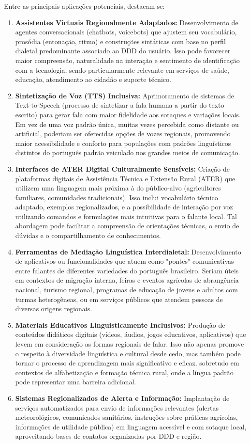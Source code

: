 Entre as principais aplicações potenciais, destacam-se:
\begin{enumerate}
    \item \textbf{Assistentes Virtuais Regionalmente Adaptados:} Desenvolvimento de agentes conversacionais (chatbots, voicebots) que ajustem seu vocabulário, prosódia (entonação, ritmo) e construções sintáticas com base no perfil dialetal predominante associado ao DDD do usuário. Isso pode favorecer maior compreensão, naturalidade na interação e sentimento de identificação com a tecnologia, sendo particularmente relevante em serviços de saúde, educação, atendimento ao cidadão e suporte técnico.
    \item \textbf{Sintetização de Voz (TTS) Inclusiva:} Aprimoramento de sistemas de Text-to-Speech (processo de sintetizar a fala humana a partir do texto escrito) para gerar fala com maior fidelidade aos sotaques e variações locais. Em vez de uma voz padrão única, muitas vezes percebida como distante ou artificial, poderiam ser oferecidas opções de vozes regionais, promovendo maior acessibilidade e conforto para populações com padrões linguísticos distintos do português padrão veiculado nos grandes meios de comunicação.
    \item \textbf{Interfaces de ATER Digital Culturalmente Sensíveis:} Criação de plataformas digitais de Assistência Técnica e Extensão Rural (ATER) que utilizem uma linguagem mais próxima à do público-alvo (agricultores familiares, comunidades tradicionais). Isso inclui vocabulário técnico adaptado, exemplos regionalizados, e a possibilidade de interação por voz utilizando comandos e formulações mais intuitivas para o falante local. Tal abordagem pode facilitar a compreensão de orientações técnicas, o envio de dúvidas e o compartilhamento de conhecimentos.
    \item \textbf{Ferramentas de Mediação Linguística Interdialetal:} Desenvolvimento de aplicativos ou funcionalidades que atuem como "pontes" comunicativas entre falantes de diferentes variedades do português brasileiro. Seriam úteis em contextos de migração interna, feiras e eventos agrícolas de abrangência nacional, turismo regional, programas de educação de jovens e adultos com turmas heterogêneas, ou em serviços públicos que atendem pessoas de diversas origens regionais.
    \item \textbf{Materiais Educativos Linguisticamente Inclusivos:} Produção de conteúdos didáticos digitais (vídeos, áudios, jogos educativos, aplicativos) que levem em consideração as formas regionais de falar. Isso não apenas promove o respeito à diversidade linguística e cultural desde cedo, mas também pode tornar o processo de aprendizagem mais significativo e eficaz, sobretudo em contextos de alfabetização e formação técnica rural, onde a língua padrão pode representar uma barreira adicional.
    \item \textbf{Sistemas Regionalizados de Alerta e Informação:} Implantação de serviços automatizados para envio de informações relevantes (alertas meteorológicos, comunicados sanitários, instruções sobre práticas agrícolas, informações de utilidade pública) em linguagem acessível e com sotaque local, aproveitando bases de contatos organizadas por DDD e região.
\end{enumerate}


